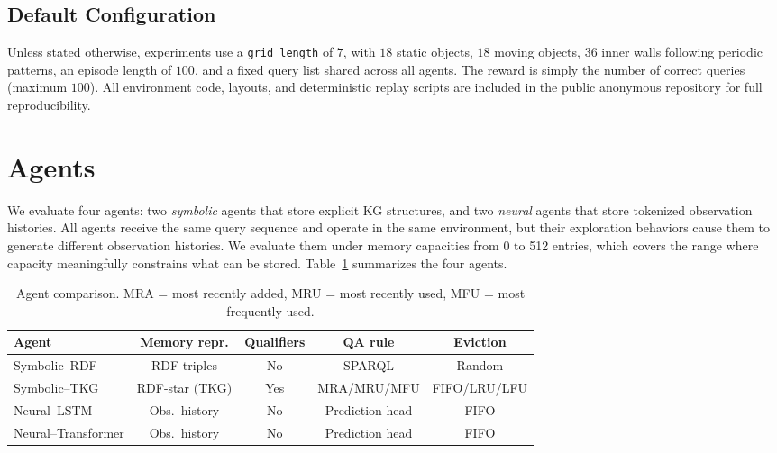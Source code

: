 \documentclass[runningheads]{llncs}
\begin{document}
\subsection{Default Configuration}

Unless stated otherwise, experiments use a \texttt{grid\_length} of $7$, with
$18$ static objects, $18$ moving objects, $36$ inner walls following periodic
patterns, an episode length of $100$, and a fixed query list shared across all
agents. The reward is simply the number of correct queries (maximum $100$).
All environment code, layouts, and deterministic replay scripts are included in
the public anonymous repository for full reproducibility.

\section{Agents}
\label{sec:agents}

We evaluate four agents: two \emph{symbolic} agents that store explicit
KG structures, and two \emph{neural} agents that store tokenized observation histories. All agents receive the same query sequence and operate in the same environment, but their exploration behaviors cause them to generate different observation histories. We evaluate them under memory capacities from 0 to 512 entries, which covers the range where capacity meaningfully constrains what can be stored. Table~\ref{tab:agents} summarizes the four agents.

\begin{table}[tb]
\centering
\small
\begin{tabular}{lcccc}
\toprule
\textbf{Agent} &
\textbf{Memory repr.} &
\textbf{Qualifiers} &
\textbf{QA rule} &
\textbf{Eviction} \\
\midrule
Symbolic--RDF &
RDF triples &
No &
SPARQL &
Random \\

Symbolic--TKG &
RDF-star (TKG) &
Yes &
MRA/MRU/MFU &
FIFO/LRU/LFU \\

Neural--LSTM &
Obs.\ history &
No &
Prediction head &
FIFO \\

Neural--Transformer &
Obs.\ history &
No &
Prediction head &
FIFO \\
\bottomrule
\end{tabular}
\caption{Agent comparison. MRA = most recently added, MRU = most recently used,
MFU = most frequently used.}
\label{tab:agents}
\end{table}
\end{document}
